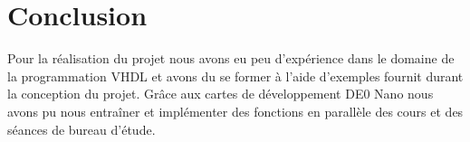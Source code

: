\section{Conclusion}
Pour la réalisation du projet nous avons eu peu d'expérience dans le domaine de la programmation VHDL et avons du se former à l'aide d'exemples fournit durant la conception du projet. Grâce aux cartes de développement DE0 Nano nous avons pu nous entraîner et implémenter des fonctions en parallèle des cours et des séances de bureau d'étude.\newline
 